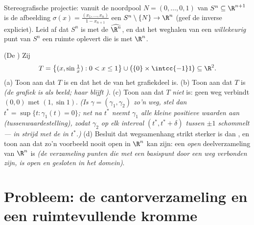 \begin{exercise}[$\star\star\star$]\label{exo:b3:topology:11}
Stereografische projectie: vanuit de noordpool $N = (0, \dots, 0,
1)$ van $S^n \subseteq \R^{n+1}$ is de afbeelding $\sigma(x) =
\frac{(x_1, \dots, x_n)}{1 - x_{n+1}}$ een  $S^n
\setminus \{N\} \to \R^n$ (geef de inverse expliciet). Leid af dat
$S^n$  is met de 
$\widehat{\R^n}$, en dat het weghalen van een \emph{willekeurig}
punt van $S^n$ een ruimte oplevert die  is met $\R^n$.
\end{exercise}

\begin{exercise}[$\star\star\star$]\label{exo:b3:topology:12}
(De ) Zij
\[
T = \bigl\{(x, \sin\tfrac1x) : 0 < x \leq 1\bigr\}
\cup \bigl(\{0\}\times\intcc{-1}1\bigr) \subseteq \R^2 .
\]
(a) Toon aan dat $T$  is en dat het de  van het
grafiekdeel is.
(b) Toon aan dat $T$  is \emph{(de grafiek is
 als  beeld; haar  blijft
)}.
(c) Toon aan dat $T$ \emph{niet}  is: geen 
weg verbindt $(0,0)$ met $(1, \sin1)$. \emph{(Is $\gamma =
(\gamma_1, \gamma_2)$ zo'n weg, stel dan $t^* = \sup\{t :
\gamma_1(t) = 0\}$; net na $t^*$ neemt $\gamma_1$ alle kleine
positieve waarden aan (tussenwaardestelling), zodat $\gamma_2$ op
elk interval $(t^*, t^* + \delta)$ tussen $\pm1$ schommelt ---
in strijd met de  in $t^*$.)}
(d) Besluit dat wegsamenhang strikt sterker is dan , en
toon aan dat zo'n voorbeeld nooit open in $\R^n$ kan zijn: een
\emph{open}  deelverzameling van $\R^n$ is
 \emph{(de verzameling punten die met een basispunt
door een weg verbonden zijn, is open en gesloten in het
domein)}.
\end{exercise}

\section{Probleem: de cantorverzameling en een ruimtevullende
kromme}

